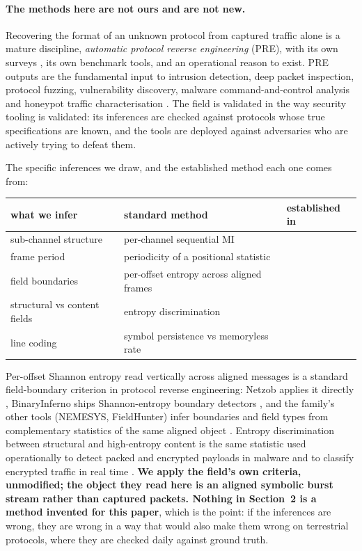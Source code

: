 \documentclass[11pt,a4paper]{article}
\begin{document}
\paragraph{The methods here are not ours and are not new.} Recovering the format of an
unknown protocol from captured traffic alone is a mature discipline, \emph{automatic
protocol reverse engineering} (PRE), with its own surveys \cite{sija2018,kleber2019,
duchene2018}, its own benchmark tools, and an operational reason to exist. PRE outputs
are the fundamental input to intrusion detection, deep packet inspection, protocol
fuzzing, vulnerability discovery, malware command-and-control analysis and honeypot
traffic characterisation \cite{sija2018,duchene2018}. The field is validated in the way
security tooling is validated: its inferences are checked against protocols whose true
specifications are known, and the tools are deployed against adversaries who are
actively trying to defeat them.

The specific inferences we draw, and the established method each one comes from:

\begin{center}
\small
\begin{tabular}{lll}
\toprule
what we infer & standard method & established in \\
\midrule
sub-channel structure & per-channel sequential MI & \cite{sija2018} \\
frame period & periodicity of a positional statistic & \cite{kleber2019} \\
field boundaries & per-offset entropy across aligned frames & \cite{kleber2019,bossert2014} \\
structural vs content fields & entropy discrimination & \cite{lyda2007,dorfinger2011} \\
line coding & symbol persistence vs memoryless rate & \cite{proakis2008} \\
\bottomrule
\end{tabular}
\end{center}

Per-offset Shannon entropy read vertically across aligned messages is a standard
field-boundary criterion in protocol reverse engineering: Netzob applies it directly
\cite{bossert2014}, BinaryInferno ships Shannon-entropy boundary detectors
\cite{chandler2023}, and the
family's other tools (NEMESYS, FieldHunter) infer boundaries and field types from
complementary statistics of the same aligned object \cite{kleber2019}. Entropy
discrimination between structural and high-entropy content is the same statistic used
operationally to detect packed and encrypted payloads in malware \cite{lyda2007} and to
classify encrypted traffic in real time \cite{dorfinger2011}. \textbf{We apply the
field's own criteria, unmodified; the object they read here is an aligned symbolic
burst stream rather than captured packets. Nothing in Section~2 is a method invented
for this paper}, which is the point: if the inferences are wrong, they are wrong in a
way that would also make them wrong on terrestrial protocols, where they are checked
daily against ground truth.
\end{document}
